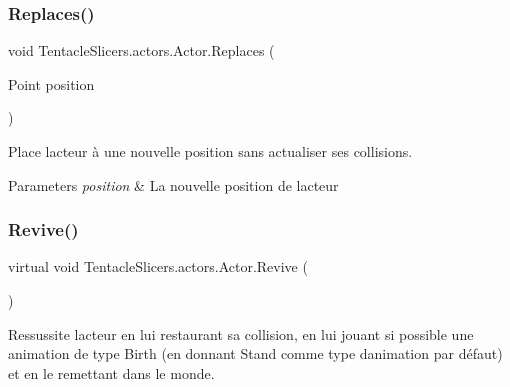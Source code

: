 \mbox{\label{class_tentacle_slicers_1_1actors_1_1_actor_acab921d9a0542c58c4d6a635f8cf93f5}} 
\subsubsection{\texorpdfstring{Replaces()}{Replaces()}}
{\footnotesize\ttfamily void Tentacle\+Slicers.\+actors.\+Actor.\+Replaces (\begin{DoxyParamCaption}\item[{Point}]{position }\end{DoxyParamCaption})}



Place l\textquotesingle{}acteur à une nouvelle position sans actualiser ses collisions. 


\begin{DoxyParams}{Parameters}
{\em position} & La nouvelle position de l\textquotesingle{}acteur \\
\hline
\end{DoxyParams}
\mbox{\label{class_tentacle_slicers_1_1actors_1_1_actor_aa41129d0d5981d185b00a8376505ebf6}} 
\subsubsection{\texorpdfstring{Revive()}{Revive()}}
{\footnotesize\ttfamily virtual void Tentacle\+Slicers.\+actors.\+Actor.\+Revive (\begin{DoxyParamCaption}{ }\end{DoxyParamCaption})\hspace{0.3cm}{\ttfamily [virtual]}}



Ressussite l\textquotesingle{}acteur en lui restaurant sa collision, en lui jouant si possible une animation de type Birth (en donnant Stand comme type d\textquotesingle{}animation par défaut) et en le remettant dans le monde. 



